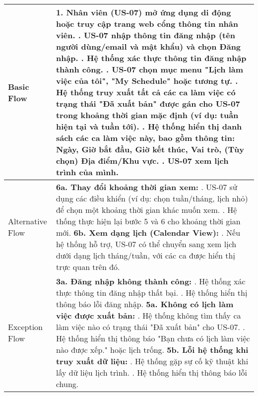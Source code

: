 \begin{longtable}{|m{4cm}|p{11cm}|}
Basic Flow & 1. Nhân viên (US-07) mở ứng dụng di động hoặc truy cập trang web cổng thông tin nhân viên. \newline 2. US-07 nhập thông tin đăng nhập (tên người dùng/email và mật khẩu) và chọn Đăng nhập. \newline 3. Hệ thống xác thực thông tin đăng nhập thành công. \newline 4. US-07 chọn mục menu "Lịch làm việc của tôi", "My Schedule" hoặc tương tự. \newline 5. Hệ thống truy xuất tất cả các ca làm việc có trạng thái "Đã xuất bản" được gán cho US-07 trong khoảng thời gian mặc định (ví dụ: tuần hiện tại và tuần tới). \newline 6. Hệ thống hiển thị danh sách các ca làm việc này, bao gồm thông tin: Ngày, Giờ bắt đầu, Giờ kết thúc, Vai trò, (Tùy chọn) Địa điểm/Khu vực. \newline 7. US-07 xem lịch trình của mình. \\
\hline
Alternative Flow & \textbf{6a. Thay đổi khoảng thời gian xem:} \newline    1. US-07 sử dụng các điều khiển (ví dụ: chọn tuần/tháng, lịch nhỏ) để chọn một khoảng thời gian khác muốn xem. \newline    2. Hệ thống thực hiện lại bước 5 và 6 cho khoảng thời gian mới. \newline \textbf{6b. Xem dạng lịch (Calendar View):} \newline    1. Nếu hệ thống hỗ trợ, US-07 có thể chuyển sang xem lịch dưới dạng lịch tháng/tuần, với các ca được hiển thị trực quan trên đó. \\
\hline
Exception Flow & \textbf{3a. Đăng nhập không thành công:} \newline    1. Hệ thống xác thực thông tin đăng nhập thất bại. \newline    2. Hệ thống hiển thị thông báo lỗi đăng nhập. \newline \textbf{5a. Không có lịch làm việc được xuất bản:} \newline    1. Hệ thống không tìm thấy ca làm việc nào có trạng thái "Đã xuất bản" cho US-07. \newline    2. Hệ thống hiển thị thông báo "Bạn chưa có lịch làm việc nào được xếp." hoặc lịch trống. \newline \textbf{5b. Lỗi hệ thống khi truy xuất dữ liệu:} \newline    1. Hệ thống gặp sự cố kỹ thuật khi lấy dữ liệu lịch trình. \newline    2. Hệ thống hiển thị thông báo lỗi chung. \\

\end{longtable}
